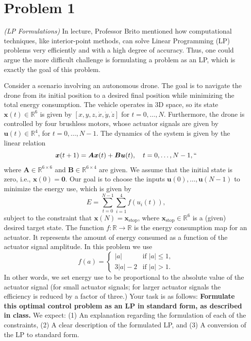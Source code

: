 \documentclass{article}
\begin{document}
\section*{Problem 1}
    \textit{(LP Formulations)} In lecture, Professor Brito mentioned how computational techniques, like interior-point methods, can solve Linear Programming (LP) problems very efficiently and with a high degree of accuracy. Thus, one could argue the more difficult challenge is formulating a problem as an LP, which is exactly the goal of this problem.

    \vspace{2mm}
    Consider a scenario involving an autonomous drone. The goal is to navigate the drone from its initial position to a desired final position while minimizing the total energy consumption. The vehicle operates in 3D space, so its state $\bm{x}(t) \in \mathbb{R}^{6}$ is given by $[x, y, z, \dot{x}, \dot{y}, \dot{z}]$ for $t = 0, \ldots, N$. Furthermore, the drone is controlled by four brushless motors, whose actuator signals are given by $\bm{u}(t) \in \mathbb{R}^{4}$, for $t = 0, \ldots, N - 1$. The dynamics of the system is given by the linear relation
    \begin{equation}
        \bm{x}(t+1) = \bm{A}\bm{x}(t) + \bm{B}\bm{u}(t), \quad t = 0, \ldots, N-1,``
    \end{equation}
    where $\bm{A} \in \mathbb{R}^{6 \times 6}$ and $\bm{B} \in \mathbb{R}^{6 \times 4}$ are given. We assume that the initial state is zero, i.e., $\bm{x}(0) = \bm{0}.$ 
    Our goal is to choose the inputs $\bm{u}(0), \ldots, \bm{u}(N - 1)$ to minimize the energy use, which is given by
    \begin{equation}
        E = \sum_{t = 0}^{N -  1} \sum_{i = 1}^{4} f(u_{i}(t)),
    \end{equation}
    subject to the constraint that $\bm{x}(N) = \bm{x}_{\text{stop}}$, where $\bm{x}_{\text{stop}} \in \mathbb{R}^{6}$ is a (given) desired target state. The function $f \colon \mathbb{R} \to \mathbb{R}$ is the energy consumption map for an actuator. It represents the amount of energy consumed as a function of the actuator signal amplitude. In this problem we use
    \begin{equation}
        f(a) =
        \begin{cases}
            |a| & \text{if } |a| \leq 1, \\
            3|a| - 2 & \text{if } |a| > 1.
        \end{cases}
    \end{equation}
    In other words, we set energy use to be proportional to the absolute value of the actuator signal (for small actuator signals; for larger actuator signals the efficiency is reduced by a factor of three.) Your task is as follows: \textbf{Formulate this optimal control problem as an LP in standard form, as described in class.} We expect: (1) An explanation regarding the formulation of each of the constraints, (2) A clear description of the formulated LP, and (3) A conversion of the LP to standard form.
\end{document}
